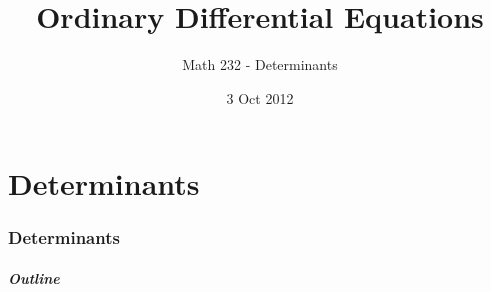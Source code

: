 \part{Determinants}
\section{Determinants}

\title{Ordinary Differential Equations}
\subtitle{Math 232 - Determinants}
\date{3 Oct 2012}

\begin{frame}
  \titlepage
\end{frame}

\begin{frame}
  \frametitle{Outline}
  \tableofcontents[currentsection]
\end{frame}


